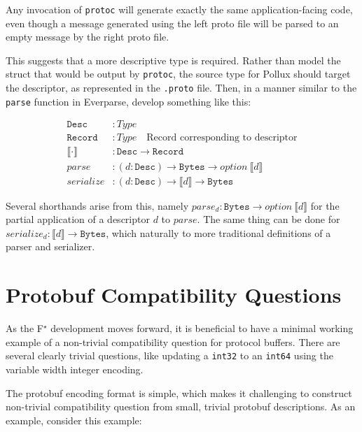 \documentclass[11pt]{article}
\newcommand{\fstar}{F\(^\star\)}
\begin{document}
Any invocation of \texttt{protoc} will generate exactly the same
application-facing code, even though a message generated using the left proto
file will be parsed to an empty message by the right proto file.

This suggests that a more descriptive type is required. Rather than model the
struct that would be output by \texttt{protoc}, the source type for Pollux
should target the descriptor, as represented in the \texttt{.proto} file. Then,
in a manner similar to the \texttt{parse} function in Everparse, develop
something like this:

\begin{align*}
	\mathtt{Desc}               & : Type                                                                             \\
	\mathtt{Record}             & : Type \quad \text{Record corresponding to descriptor}                             \\
	\llbracket \cdot \rrbracket & : \mathtt{Desc} \rightarrow \mathtt{Record}                                        \\
	parse                       & : (d:\mathtt{Desc}) \rightarrow \mathtt{Bytes} \rightarrow option\
	\llbracket d \rrbracket                                                                                          \\
	serialize                   & : (d:\mathtt{Desc}) \rightarrow \llbracket d \rrbracket \rightarrow \mathtt{Bytes}
\end{align*}

Several shorthands arise from this, namely $parse_d : \mathtt{Bytes} \rightarrow option\
	\llbracket d \rrbracket$ for the partial application of a descriptor $d$ to
$parse$. The same thing can be done for $serialize_d : \llbracket d \rrbracket \rightarrow
	\mathtt{Bytes}$, which naturally to more traditional definitions of a parser and serializer.

\section{Protobuf Compatibility Questions}

As the \fstar{} development moves forward, it is beneficial to have a minimal
working example of a non-trivial compatibility question for protocol
buffers. There are several clearly trivial questions, like updating a
\texttt{int32} to an \texttt{int64} using the variable width integer encoding.

The protobuf encoding format is simple, which makes it challenging to construct
non-trivial compatibility question from small, trivial protobuf descriptions. As
an example, consider this example:
\end{document}

